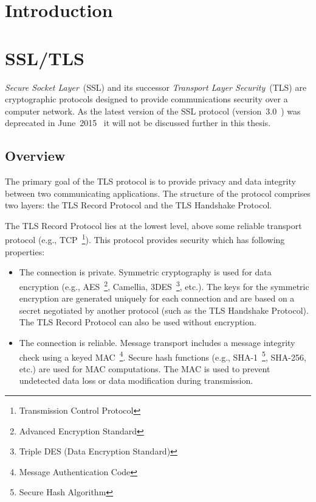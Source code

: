 
\chapter{Introduction}
\chapter{SSL/TLS}
    \textit{Secure Socket Layer}~(SSL) and its successor
    \textit{Transport Layer Security}~(TLS) are cryptographic protocols
    designed to provide communications security over a computer network. As
    the latest version of the SSL protocol (version~3.0~\cite{rfc6101}) was
    deprecated in June~2015~\cite{rfc7568} it will not be discussed
    further in this thesis.


\section{Overview}\label{overview}
    The primary goal of the TLS protocol is to provide privacy and data
    integrity between two communicating applications. The structure of
    the protocol comprises two layers: the TLS Record Protocol and
    the TLS Handshake Protocol.

    The TLS Record Protocol lies at the lowest level, above some reliable
    transport protocol (e.g., TCP~\footnote{Transmission Control Protocol}).
    This protocol provides security which has following properties:
    \begin{itemize}
        \item The connection is private. Symmetric cryptography is used
        for data encryption (e.g., AES~\footnote{Advanced Encryption Standard},
        Camellia, 3DES~\footnote{Triple DES (Data Encryption Standard)}, etc.).
        The keys for the symmetric encryption are generated uniquely
        for each connection
        and are based on a secret negotiated by another protocol
        (such as the TLS Handshake Protocol). The TLS Record Protocol can also
        be used without encryption.
        \item The connection is reliable. Message transport includes
        a message integrity check using a keyed
        MAC~\footnote{Message Authentication Code}. Secure hash functions
        (e.g., SHA-1~\footnote{Secure Hash Algorithm}, SHA-256, etc.) are
        used for MAC computations. The MAC is used to prevent undetected
        data loss or data modification during transmission.
    \end{itemize}

